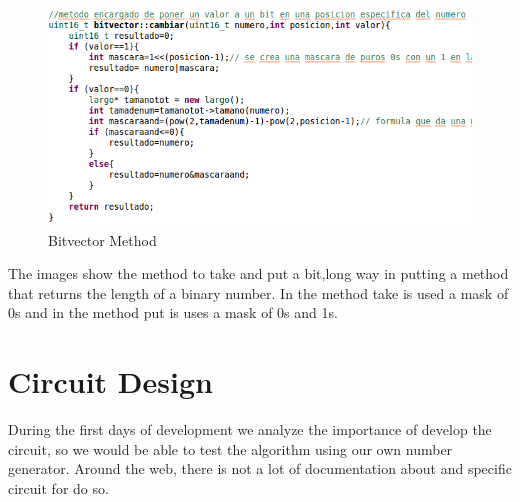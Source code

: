 \documentclass[twocolumn]{IEEEtran}
\begin{document}
\begin{enumerate}
        \begin{figure}[h!]
        \centering
        \includegraphics[width=\columnwidth]{src/bitvectorponer.png}
        \caption{Bitvector Method}
        \end{figure}
        The images show the method to take and put a bit,long way in putting a method that returns the length of a binary number. In the method take is used a mask of 0s and in the method put is uses a mask of 0s and 1s.

\end{enumerate}

    
\section{Circuit Design}
During the first days of development we analyze the importance of develop the circuit, so we would be able to test the algorithm using our own number generator. Around the web, there is not a lot of documentation about and specific circuit for do so.
\end{document}
